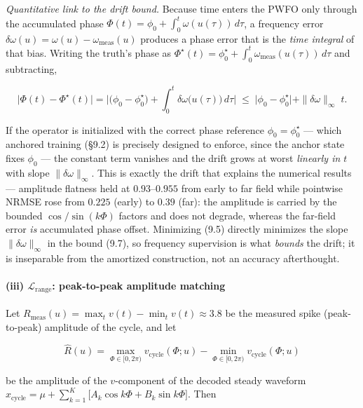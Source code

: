 \documentclass[
  11pt,
]{article}
\begin{document}
\emph{Quantitative link to the drift bound.} Because time enters the
PWFO only through the accumulated phase
\(\Phi(t)=\phi_0+\int_0^t\omega(u(\tau))\,d\tau\), a frequency error
\(\delta\omega(u)=\omega(u)-\omega_{\text{meas}}(u)\) produces a phase
error that is the \emph{time integral} of that bias. Writing the truth's
phase as
\(\Phi^\star(t)=\phi_0^\star+\int_0^t\omega_{\text{meas}}(u(\tau))\,d\tau\)
and subtracting,

\[
\big|\Phi(t)-\Phi^\star(t)\big|
=\Big|\big(\phi_0-\phi_0^\star\big)+\!\int_0^t \delta\omega\big(u(\tau)\big)\,d\tau\Big|
\;\le\;\big|\phi_0-\phi_0^\star\big|+\|\delta\omega\|_{\infty}\;t .
\tag{9.7}
\]

If the operator is initialized with the correct phase reference
\(\phi_0=\phi_0^\star\) --- which anchored training (§9.2) is precisely
designed to enforce, since the anchor state fixes \(\phi_0\) --- the
constant term vanishes and the drift grows at worst \emph{linearly in
\(t\)} with slope \(\|\delta\omega\|_\infty\). This is exactly the drift
that explains the numerical results --- amplitude flatness held at
\(0.93\)--\(0.955\) from early to far field while pointwise NRMSE rose
from \(0.225\) (early) to \(0.39\) (far): the amplitude is carried by
the bounded \(\cos/\sin(k\Phi)\) factors and does not degrade, whereas
the far-field error \emph{is} accumulated phase offset. Minimizing (9.5)
directly minimizes the slope \(\|\delta\omega\|_\infty\) in the bound
(9.7), so frequency supervision is what \emph{bounds} the drift; it is
inseparable from the amortized construction, not an accuracy
afterthought.

\paragraph{\texorpdfstring{(iii) \(\mathcal{L}_{\text{range}}\):
peak-to-peak amplitude
matching}{(iii) \textbackslash mathcal\{L\}\_\{\textbackslash text\{range\}\}: peak-to-peak amplitude matching}}\label{iii-mathcall_textrange-peak-to-peak-amplitude-matching}

Let \(R_{\text{meas}}(u)=\max_t v(t)-\min_t v(t)\approx 3.8\) be the
measured spike (peak-to-peak) amplitude of the cycle, and let

\[
\hat{R}(u)=\max_{\Phi\in[0,2\pi)} v_{\text{cycle}}(\Phi;u)-\min_{\Phi\in[0,2\pi)} v_{\text{cycle}}(\Phi;u)
\]

be the amplitude of the \(v\)-component of the decoded steady waveform
\(x_{\text{cycle}}=\mu+\sum_{k=1}^{K}\!\big[A_k\cos k\Phi+B_k\sin k\Phi\big]\).
Then
\end{document}
